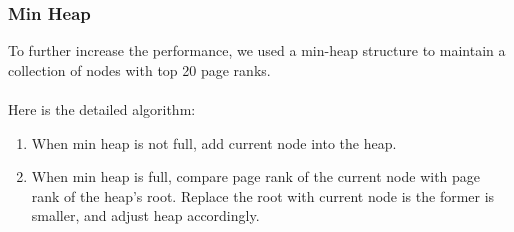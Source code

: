 \documentclass[12pt]{article}
\begin{document}
\subsubsection{Min Heap}
To further increase the performance, we used a min-heap structure to maintain a collection of nodes with top 20 page ranks. \\\\
Here is the detailed algorithm:
\begin{enumerate}
\item When min heap is not full, add current node into the heap.
\item When min heap is full, compare page rank of the current node with page rank of the heap's root. Replace the root with current node is the former is smaller, and adjust heap accordingly.
\end{enumerate}
\end{document}
